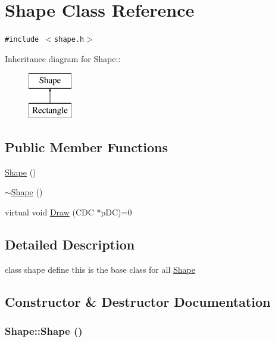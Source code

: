 \hypertarget{classShape}{
\section{Shape Class Reference}
\label{classShape}
}
{\tt \#include $<$shape.h$>$}

Inheritance diagram for Shape::\begin{figure}[H]
\begin{center}
\leavevmode
\includegraphics[height=2cm]{classShape}
\end{center}
\end{figure}
\subsection*{Public Member Functions}
\begin{CompactItemize}
\item 
\hyperlink{classShape_aa8d87171e65e0d8ba3c5459978992a7}{Shape} ()
\item 
\hyperlink{classShape_935afc9e576015f967d90de56977167d}{$\sim$Shape} ()
\item 
virtual void \hyperlink{classShape_ef21058ba7bb2497796f678b0607cf5d}{Draw} (CDC $\ast$pDC)=0
\end{CompactItemize}


\subsection{Detailed Description}
class shape define this is the base class for all \hyperlink{classShape}{Shape} 

\subsection{Constructor \& Destructor Documentation}
\hypertarget{classShape_aa8d87171e65e0d8ba3c5459978992a7}{
\subsubsection[Shape]{\setlength{\rightskip}{0pt plus 5cm}Shape::Shape ()}}
\label{classShape_aa8d87171e65e0d8ba3c5459978992a7}



